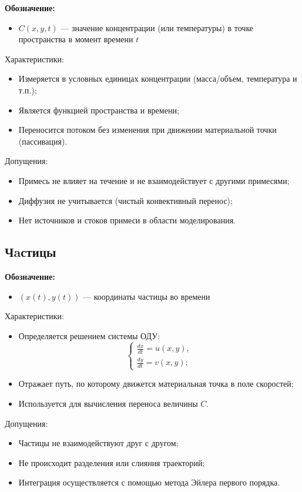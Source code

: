 \documentclass[a4paper,12pt]{article}
\begin{document}
\textbf{Обозначение:}  
\begin{itemize}
    \item $C(x, y, t)$ — значение концентрации (или температуры) в точке пространства в момент времени $t$
\end{itemize}
Характеристики:
\begin{itemize}
    \item Измеряется в условных единицах концентрации (масса/объем, температура и т.п.);
    \item Является функцией пространства и времени;
    \item Переносится потоком без изменения при движении материальной точки (пассивация).
\end{itemize}
Допущения:
\begin{itemize}
    \item Примесь не влияет на течение и не взаимодействует с другими примесями;
    \item Диффузия не учитывается (чистый конвективный перенос);
    \item Нет источников и стоков примеси в области моделирования.
\end{itemize}


\subsection{Чaстицы}
\textbf{Обозначение:}  
\begin{itemize}
    \item $(x(t), y(t))$ — координаты частицы во времени
\end{itemize}
Характеристики:
\begin{itemize}
    \item Определяется решением системы ОДУ:  
    \[
    \begin{cases}
    \frac{dx}{dt} = u(x,y), \\
    \frac{dy}{dt} = v(x,y);
    \end{cases}
    \]
    \item Отражает путь, по которому движется материальная точка в поле скоростей;
    \item Используется для вычисления переноса величины $C$.
\end{itemize}
Допущения:
\begin{itemize}
    \item Частицы не взаимодействуют друг с другом;
    \item Не происходит разделения или слияния траекторий;
    \item Интеграция осуществляется с помощью метода Эйлера первого порядка.
\end{itemize}
\end{document}
